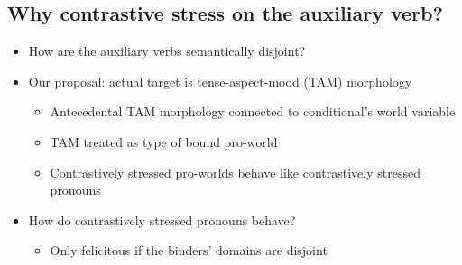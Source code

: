 \subsection{Why contrastive stress on the auxiliary verb?}
\begin{frame}[t]
    \subsectionpage\vskip 9pt
    \begin{itemize}
        \item<2-> How are the auxiliary verbs semantically disjoint?\vskip 9pt
        \item<3-> Our proposal: actual target is tense-aspect-mood (TAM) morphology\vskip 4.5pt
            \begin{itemize}
                \item<4-> Antecedental TAM morphology connected to conditional's world variable
                \item<5-> TAM treated as type of bound pro-world \citep{Schlenker2005}
                \item<6-> Contrastively stressed pro-worlds behave like contrastively stressed pronouns
            \end{itemize}\vskip 4.5pt
        \item<7-> How do contrastively stressed pronouns behave?\vskip 4.5pt
            \begin{itemize}
                \item<8-> Only felicitous if the binders' domains are disjoint \citep{Sauerland1998,Sauerland1999} 
            \end{itemize}
    \end{itemize}
\end{frame}

